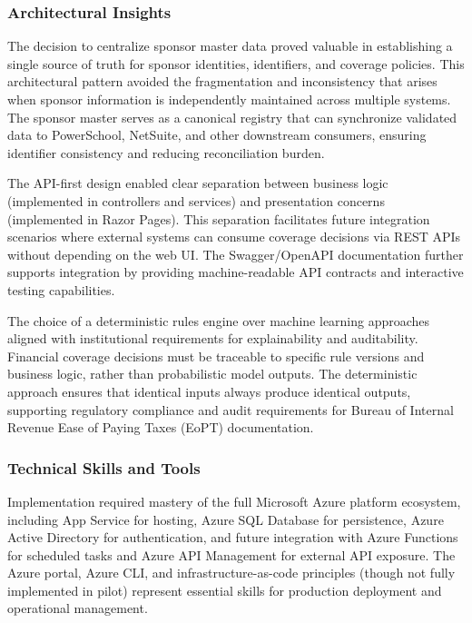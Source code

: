 \subsubsection{Architectural Insights}

The decision to centralize sponsor master data proved valuable in establishing a single source of truth for sponsor identities, identifiers, and coverage policies. This architectural pattern avoided the fragmentation and inconsistency that arises when sponsor information is independently maintained across multiple systems. The sponsor master serves as a canonical registry that can synchronize validated data to PowerSchool, NetSuite, and other downstream consumers, ensuring identifier consistency and reducing reconciliation burden.

The API-first design enabled clear separation between business logic (implemented in controllers and services) and presentation concerns (implemented in Razor Pages). This separation facilitates future integration scenarios where external systems can consume coverage decisions via REST APIs without depending on the web UI. The Swagger/OpenAPI documentation further supports integration by providing machine-readable API contracts and interactive testing capabilities.

The choice of a deterministic rules engine over machine learning approaches aligned with institutional requirements for explainability and auditability. Financial coverage decisions must be traceable to specific rule versions and business logic, rather than probabilistic model outputs. The deterministic approach ensures that identical inputs always produce identical outputs, supporting regulatory compliance and audit requirements for Bureau of Internal Revenue Ease of Paying Taxes (EoPT) documentation.

\subsubsection{Technical Skills and Tools}

Implementation required mastery of the full Microsoft Azure platform ecosystem, including App Service for hosting, Azure SQL Database for persistence, Azure Active Directory for authentication, and future integration with Azure Functions for scheduled tasks and Azure API Management for external API exposure. The Azure portal, Azure CLI, and infrastructure-as-code principles (though not fully implemented in pilot) represent essential skills for production deployment and operational management.


